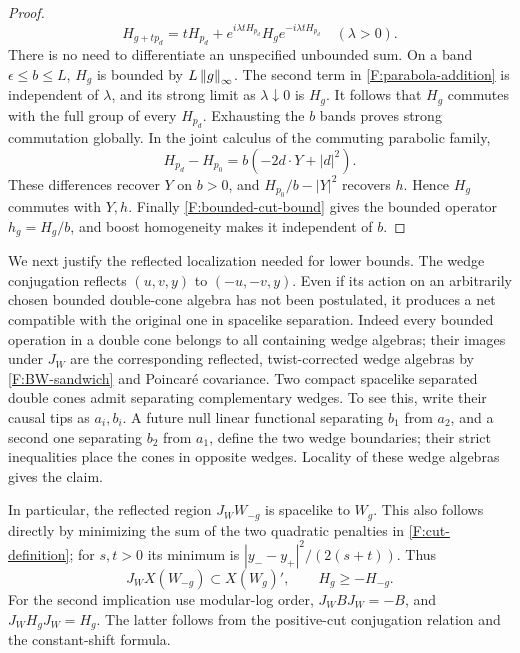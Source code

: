 \begin{proof}
\begin{equation}\label{F:parabola-addition}
 H_{g+tp_d}=tH_{p_d}
    +e^{i\lambda tH_{p_d}}H_g e^{-i\lambda tH_{p_d}}
 \quad(\lambda>0).
\end{equation}
There is no need to differentiate an unspecified unbounded sum. On a
band $\epsilon\le b\le L$, $H_g$ is bounded by
$L\left\lVert g\right\rVert_\infty$. The second term in \eqref{F:parabola-addition} is
independent of $\lambda$, and its strong limit as $\lambda\downarrow0$
is $H_g$. It follows that $H_g$ commutes with the full group of every
$H_{p_d}$. Exhausting the $b$ bands proves strong commutation globally.
In the joint calculus of the commuting parabolic family,
\[
 H_{p_d}-H_{p_0}=b(-2d\cdot Y+|d|^2).
\]
These differences recover $Y$ on $b>0$, and $H_{p_0}/b-|Y|^2$ recovers
$h$. Hence $H_g$ commutes with $Y,h$. Finally
\eqref{F:bounded-cut-bound} gives the bounded operator $h_g=H_g/b$,
and boost homogeneity makes it independent of $b$.
\end{proof}

We next justify the reflected localization needed for lower bounds.
The wedge conjugation reflects $(u,v,y)$ to $(-u,-v,y)$. Even if its
action on an arbitrarily chosen bounded double-cone algebra has not
been postulated, it produces a net compatible with the original one
in spacelike separation. Indeed every bounded operation in a double
cone belongs to all containing wedge algebras; their images under
$J_W$ are the corresponding reflected, twist-corrected wedge algebras
by \eqref{F:BW-sandwich} and Poincar\'e covariance. Two compact
spacelike separated double cones admit separating complementary
wedges. To see this, write their causal tips as $a_i,b_i$. A future
null linear functional separating $b_1$ from $a_2$, and a second one
separating $b_2$ from $a_1$, define the two wedge boundaries; their
strict inequalities place the cones in opposite wedges. Locality of
these wedge algebras gives the claim.

In particular, the reflected region $J_WW_{-g}$ is spacelike to $W_g$.
This also follows directly by minimizing the sum of the two quadratic
penalties in \eqref{F:cut-definition}; for $s,t>0$ its minimum is
$|y_--y_+|^2/(2(s+t))$. Thus
\begin{equation}\label{F:reflected-order}
 J_WX(W_{-g})\subset X(W_g)',\qquad H_g\ge-H_{-g}.
\end{equation}
For the second implication use modular-log order,
$J_WBJ_W=-B$, and $J_WH_gJ_W=H_g$. The latter follows from the
positive-cut conjugation relation and the constant-shift formula.

